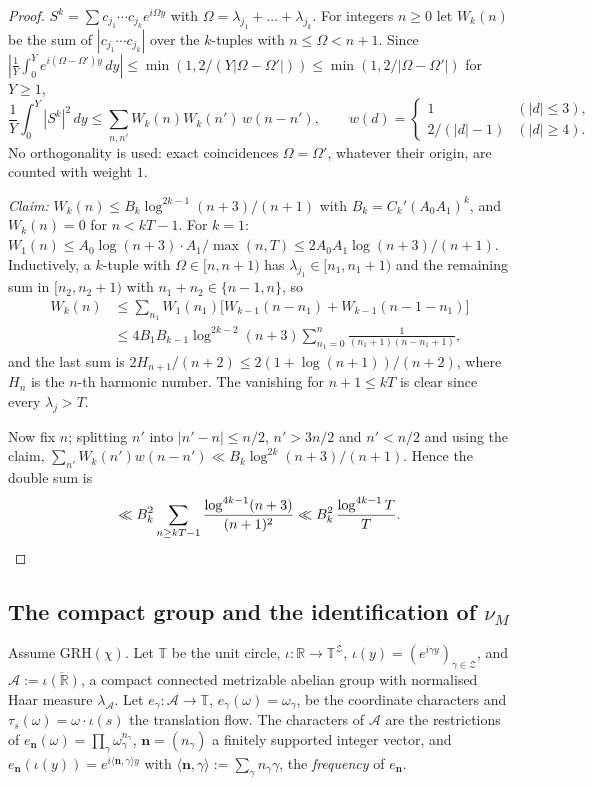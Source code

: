\documentclass[11pt]{amsart}
\theoremstyle{definition}
\numberwithin{equation}{section}
\newcommand{\cA}{\mathcal A}          %
\newcommand{\cZ}{\mathcal Z}          %
\newcommand{\hA}{\lambda_{\cA}}       %
\begin{document}
\begin{proof}
$S^k=\sum c_{j_1}\cdots c_{j_k}e^{i\Omega y}$ with
$\Omega=\lambda_{j_1}+\dots+\lambda_{j_k}$. For integers $n\ge0$ let
$W_k(n)$ be the sum of $|c_{j_1}\cdots c_{j_k}|$ over the $k$-tuples
with $n\le\Omega<n+1$. Since
$|\frac1Y\int_0^Ye^{i(\Omega-\Omega')y}\,dy|\le
\min(1,2/(Y|\Omega-\Omega'|))\le\min(1,2/|\Omega-\Omega'|)$ for
$Y\ge1$,
\[
\frac1Y\int_0^Y|S^k|^2\,dy\le\sum_{n,n'}W_k(n)W_k(n')\,w(n-n'),
\qquad
w(d)=\begin{cases}1&(|d|\le3),\\ 2/(|d|-1)&(|d|\ge4).\end{cases}
\]
No orthogonality is used: exact coincidences $\Omega=\Omega'$,
whatever their origin, are counted with weight $1$.

\emph{Claim:} $W_k(n)\le B_k\log^{2k-1}(n+3)/(n+1)$ with
$B_k=C_k'(A_0A_1)^k$, and $W_k(n)=0$ for $n<kT-1$. For $k=1$:
$W_1(n)\le A_0\log(n+3)\cdot A_1/\max(n,T)\le2A_0A_1\log(n+3)/(n+1)$.
Inductively, a $k$-tuple with $\Omega\in[n,n+1)$ has
$\lambda_{j_1}\in[n_1,n_1+1)$ and the remaining sum in
$[n_2,n_2+1)$ with $n_1+n_2\in\{n-1,n\}$, so
\begin{align*}
W_k(n)&\le\sum_{n_1}W_1(n_1)\bigl[W_{k-1}(n-n_1)+W_{k-1}(n-1-n_1)\bigr]\\
&\le4B_1B_{k-1}\log^{2k-2}(n+3)\sum_{n_1=0}^{n}
\frac1{(n_1+1)(n-n_1+1)},
\end{align*}
and the last sum is $2H_{n+1}/(n+2)\le2(1+\log(n+1))/(n+2)$, where
$H_n$ is the $n$-th harmonic number. The vanishing for $n+1\le kT$ is
clear since every $\lambda_j>T$.

Now fix $n$; splitting $n'$ into $|n'-n|\le n/2$, $n'>3n/2$ and
$n'<n/2$ and using the claim,
$\sum_{n'}W_k(n')w(n-n')\ll B_k\log^{2k}(n+3)/(n+1)$. Hence the
double sum is
\[
\ll B_k^2\sum_{n\ge kT-1}\frac{\log^{4k-1}(n+3)}{(n+1)^2}
\ll B_k^2\,\frac{\log^{4k-1}T}{T}.\qedhere
\]
\end{proof}

\subsection{The compact group and the identification of
\texorpdfstring{$\nu_M$}{nu\_M}}

Assume GRH$(\chi)$. Let $\mathbb T$ be the unit circle,
$\iota:\mathbb R\to\mathbb T^{\cZ}$,
$\iota(y)=(e^{i\gamma y})_{\gamma\in\cZ}$, and
$\cA:=\overline{\iota(\mathbb R)}$, a compact connected metrizable
abelian group with normalised Haar measure $\hA$. Let
$e_\gamma:\cA\to\mathbb T$, $e_\gamma(\omega)=\omega_\gamma$, be the
coordinate characters and $\tau_s(\omega)=\omega\cdot\iota(s)$ the
translation flow. The characters of $\cA$ are the restrictions of
$e_{\mathbf n}(\omega)=\prod_\gamma\omega_\gamma^{n_\gamma}$,
$\mathbf n=(n_\gamma)$ a finitely supported integer vector, and
$e_{\mathbf n}(\iota(y))=e^{i\langle\mathbf n,\gamma\rangle y}$ with
$\langle\mathbf n,\gamma\rangle:=\sum_\gamma n_\gamma\gamma$, the
\emph{frequency} of $e_{\mathbf n}$.
\end{document}

